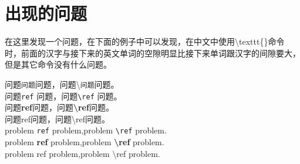 \section{出现的问题}
在这里发现一个问题，在下面的例子中可以发现，在中文中使用\textbackslash texttt\{\}命令时，前面的汉字与接下来的英文单词的空隙明显比接下来单词跟汉字的间隙要大，但是其它命令没有什么问题。

\begin{center}
\noindent 问题\texttt{问题}问题，问题\textbackslash\texttt{问题}问题。\\
问题\texttt{ref} 问题，问题\texttt{\textbackslash ref} 问题。\\
问题\textbf{ref}问题，问题\textbf{\textbackslash ref}问题。\\
问题\textsf{ref}问题，问题\textsf{\textbackslash ref}问题。\\
problem \texttt{ref} problem,problem \texttt{\textbackslash ref} problem.\\
problem \textbf{ref} problem,problem \textbf{\textbackslash ref} problem.\\
problem \textsf{ref} problem,problem \textsf{\textbackslash ref} problem.
\end{center}
